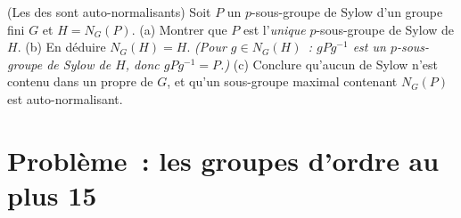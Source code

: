 \begin{exercise}[$\star\star$]\label{exo:b3:groups:12}
(Les  des  sont
auto-normalisants) Soit $P$ un $p$-sous-groupe de Sylow d'un
groupe fini $G$ et $H = N_G(P)$.
(a) Montrer que $P$ est l'\emph{unique} $p$-sous-groupe de Sylow
de $H$.
(b) En déduire $N_G(H) = H$. \emph{(Pour $g \in N_G(H)$~:
$gPg^{-1}$ est un $p$-sous-groupe de Sylow de $H$, donc
$gPg^{-1} = P$.)}
(c) Conclure qu'aucun  de Sylow n'est contenu dans
un  propre de $G$, et qu'un sous-groupe maximal
contenant $N_G(P)$ est auto-normalisant.
\end{exercise}

\section{Problème~: les groupes d'ordre au plus 15}

